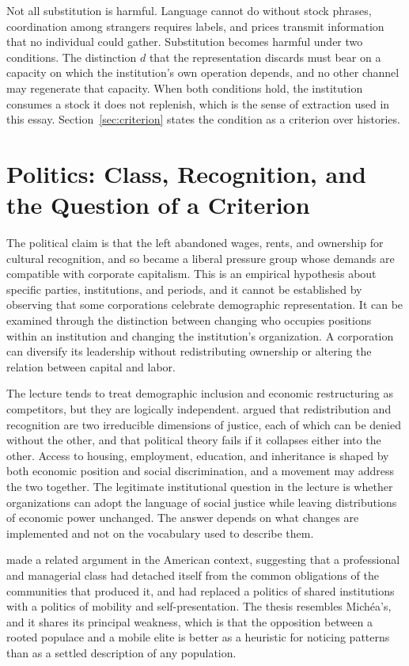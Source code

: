 \documentclass[12pt]{article}
\begin{document}
Not all substitution is harmful. Language cannot do without stock phrases, coordination among strangers requires labels, and prices transmit information that no individual could gather. Substitution becomes harmful under two conditions. The distinction $d$ that the representation discards must bear on a capacity on which the institution's own operation depends, and no other channel may regenerate that capacity. When both conditions hold, the institution consumes a stock it does not replenish, which is the sense of extraction used in this essay. Section~\ref{sec:criterion} states the condition as a criterion over histories.

\section{Politics: Class, Recognition, and the Question of a Criterion}
\label{sec:politics}

The political claim is that the left abandoned wages, rents, and ownership for cultural recognition, and so became a liberal pressure group whose demands are compatible with corporate capitalism. This is an empirical hypothesis about specific parties, institutions, and periods, and it cannot be established by observing that some corporations celebrate demographic representation. It can be examined through the distinction between changing who occupies positions within an institution and changing the institution's organization. A corporation can diversify its leadership without redistributing ownership or altering the relation between capital and labor.

The lecture tends to treat demographic inclusion and economic restructuring as competitors, but they are logically independent. \citet{fraserhonneth} argued that redistribution and recognition are two irreducible dimensions of justice, each of which can be denied without the other, and that political theory fails if it collapses either into the other. Access to housing, employment, education, and inheritance is shaped by both economic position and social discrimination, and a movement may address the two together. The legitimate institutional question in the lecture is whether organizations can adopt the language of social justice while leaving distributions of economic power unchanged. The answer depends on what changes are implemented and not on the vocabulary used to describe them.

\citet{lasch} made a related argument in the American context, suggesting that a professional and managerial class had detached itself from the common obligations of the communities that produced it, and had replaced a politics of shared institutions with a politics of mobility and self-presentation. The thesis resembles Michéa's, and it shares its principal weakness, which is that the opposition between a rooted populace and a mobile elite is better as a heuristic for noticing patterns than as a settled description of any population.
\end{document}
